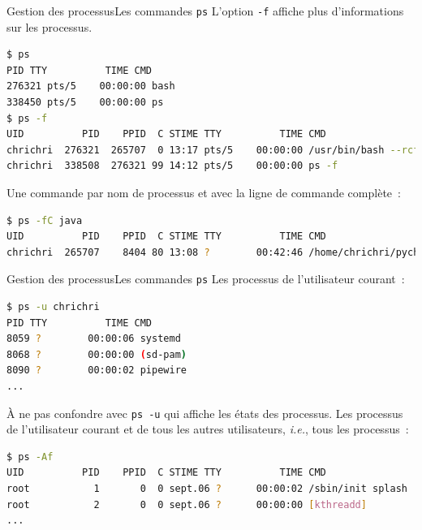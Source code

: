 \documentclass{beamer}
\begin{document}
    \begin{frame}[fragile]{Gestion des processus}{Les commandes \lstinline{ps}}
        L'option \lstinline{-f} affiche plus d'informations sur les processus.
        \begin{lstlisting}[language=bash,basicstyle=\tiny\ttfamily]
$ ps
PID TTY          TIME CMD
276321 pts/5    00:00:00 bash
338450 pts/5    00:00:00 ps
$ ps -f
UID          PID    PPID  C STIME TTY          TIME CMD
chrichri  276321  265707  0 13:17 pts/5    00:00:00 /usr/bin/bash --rcfile /home/chrichri/pycharm-professional-2024.1.4/pycharm-2024.1.4/plugins/terminal/shell-integrations/bash/bash-integration.bash -i
chrichri  338508  276321 99 14:12 pts/5    00:00:00 ps -f
        \end{lstlisting}
        Une commande par nom de processus et avec la ligne de commande complète~:
        \begin{lstlisting}[language=bash,basicstyle=\tiny\ttfamily]
$ ps -fC java
UID          PID    PPID  C STIME TTY          TIME CMD
chrichri  265707    8404 80 13:08 ?        00:42:46 /home/chrichri/pycharm...
        \end{lstlisting}
    \end{frame}

    \begin{frame}[fragile]{Gestion des processus}{Les commandes \lstinline{ps}}
        Les processus de l'utilisateur courant~:
        \begin{lstlisting}[language=bash]
$ ps -u chrichri
PID TTY          TIME CMD
8059 ?        00:00:06 systemd
8068 ?        00:00:00 (sd-pam)
8090 ?        00:00:02 pipewire
...
        \end{lstlisting}
        \bigbreak
        À ne pas confondre avec \lstinline{ps -u} qui affiche les états des processus.
        \bigbreak
        Les processus de l'utilisateur courant et de tous les autres utilisateurs, \textit{i.e.}, tous les processus~:
        \begin{lstlisting}[language=bash]
$ ps -Af
UID          PID    PPID  C STIME TTY          TIME CMD
root           1       0  0 sept.06 ?      00:00:02 /sbin/init splash
root           2       0  0 sept.06 ?      00:00:00 [kthreadd]
...
        \end{lstlisting}
    \end{frame}
\end{document}
